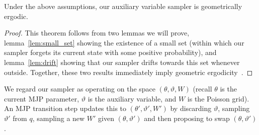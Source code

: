 

\begin{theorem}
Under the above assumptions, our auxiliary variable sampler is
geometrically ergodic.  \label{thm:geom_erg}
\end{theorem}
\begin{proof}
\noindent This theorem follows from two lemmas we will prove,
lemma~\ref{lem:small_set} showing the existence of a small set (within
which our sampler forgets its
current state with some positive probability), and lemma~\ref{lem:drift}
showing that our sampler drifts towards this set whenever
outside. Together, these two results immediately imply geometric
ergodicity~\citep[Theorems 15.0.1 and Lemma 15.2.8]{meyn2009}.
\end{proof}
We regard our sampler as operating on the space $(\theta,\vartheta,W)$
(recall $\theta$ is the current MJP parameter, $\vartheta$ is the
auxiliary variable, and $W$ is the Poisson grid). An MJP transition step
updates this to $(\theta',\vartheta',W')$ by discarding $\vartheta$, 
sampling $\vartheta'$ from $q$, sampling a new $W'$ given 
$(\theta,\vartheta')$ and then proposing to swap $(\theta,\vartheta')$.

